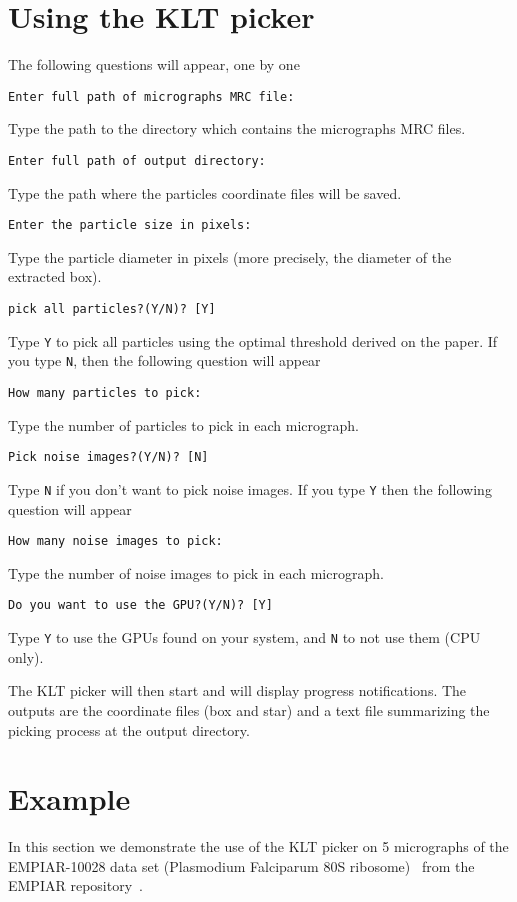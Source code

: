 \documentclass[12pt,a4paper]{article}
\begin{document}
\section{Using the KLT picker}\label{sec:usage}
The following questions will appear, one by one
\begin{flushleft}
\texttt{Enter full path of micrographs MRC file: }
\end{flushleft}
Type the path to the directory which contains the micrographs MRC files.
\begin{flushleft}
	\texttt{Enter full path of output directory:}
\end{flushleft}
Type the path where the particles coordinate files will be saved.
\begin{flushleft}
	\texttt{Enter the particle size in pixels:}
\end{flushleft}
Type the particle diameter in pixels (more precisely, the diameter of the extracted box).
\begin{flushleft}
	\texttt{pick all particles?(Y/N)? [Y] }
\end{flushleft}
 Type \texttt{Y} to pick all particles using the optimal threshold derived on the paper. If you type \texttt{N}, then the following question will appear
 \begin{flushleft}
 	\texttt{How many particles to pick: }
 \end{flushleft}
Type the number of particles to pick in each micrograph.
\begin{flushleft}
	\texttt{Pick noise images?(Y/N)? [N]}
\end{flushleft}
Type \texttt{N} if you don't want to pick noise images. If you type \texttt{Y} then the following question will appear
\begin{flushleft}
	\texttt{How many noise images to pick:}
\end{flushleft}
Type the number of noise images to pick in each micrograph.
\begin{flushleft}
	\texttt{Do you want to use the GPU?(Y/N)? [Y] }
\end{flushleft}
 Type \texttt{Y} to use the GPUs found on your system, and \texttt{N} to not use them (CPU only).

 \bigskip

 The KLT picker will then start and will display progress notifications.
 The outputs are the coordinate files (box and star) and a text file summarizing the picking process at the output directory.

 \section{Example}\label{sec:example}
In this section we demonstrate the use of the KLT picker on 5 micrographs of the EMPIAR-10028 data set (Plasmodium Falciparum 80S ribosome)~\cite{10028} from the EMPIAR repository~\cite{EMPIAR}.
\end{document}
